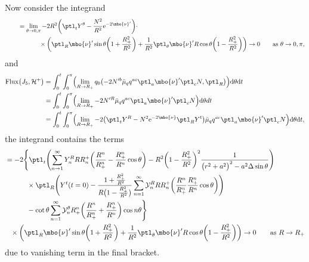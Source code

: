 Now consider the integrand
\begin{align*}
\qquad&{}= \lim_{\theta \to 0, \pi}-2 R^2 \biggl(\ptl_ t Y^\theta - \frac{N^2}{R^2} {\rm e}^{-2 \mbo{\nu}'} \biggr) \cdot \notag\\
&\hphantom{= \lim_{\theta \to 0, \pi}}{} \times \biggl( \ptl_R \mbo{\nu}' \sin \theta \biggl(1 + \frac{R^2_+}{R^2}\biggr) + \frac{1}{R^2} \ptl_ \theta \mbo{\nu}' R \cos \theta \biggl(1- \frac{R^2_+}{R^2}\biggr) \biggr)
 \to 0 \qquad \text{as} \ \theta \to 0, \pi,
\end{align*}
and
\begin{align*}
{\rm Flux} \bigl(J_5, \mathcal{H}^+\bigr) &{}= \int^t_0 \int^\pi _0 \Bigl(\lim_{R \to R_+} q_0 \bigl(-2N'^b \bar{\mu}_q q^{ac} \ptl_a \mbo{\nu}' \ptl_c N, \ptl_R\bigr) \Bigr) {\rm d}\theta {\rm d}t \notag \\
&{}= \int^t_0 \int^\pi _0 \Bigl(\lim_{R \to R_+} - 2 N'^R \bar{\mu}_q q^{ac} \ptl_a \mbo{\nu}' \ptl_c N \Bigr) {\rm d}\theta d t \notag \\
&{}= \int^t_0 \int^\pi_0 \Bigl( \lim_{R \to R_+} -2\bigl(\ptl_t Y^R - N^2 {\rm e}^{-2 \mbo{\nu}} \ptl_R Y^t\bigr) \bar{\mu}_q q^{ac} \ptl_a \mbo{\nu}' \ptl_c N \Bigr) {\rm d}\theta {\rm d}t,
\end{align*}
the integrand contains the terms
\begin{align*}
&
=- 2 \Biggl\{ \ptl_t \Biggl(\sum^\infty_{n \to 1} Y^R_n R R^+_n \biggl(\frac{R^n}{R^n_+}- \frac{R_+^n}{R^n} \cos \theta\biggr) - R^2 \biggl(1- \frac{R^2_+}{R^2}\biggr)^2 \frac{1}{ \bigl(r^2 +a^2\bigr)^2 - a^2 \Delta \sin \theta} \Biggr) \notag\\
&\hphantom{=- 2 \Biggl\{}{}
\times\ptl_R \Biggl(Y^t(t=0)- \frac{1+ \frac{R^2_+}{R^2}}{R \bigl(1- \frac{R_+^2}{R^2}\bigr)} \sum^\infty_{n = 1} \mathcal{Y}^R_n R R^+_n \biggl(\frac{R^n}{R^n_+} \frac{R_+^n}{R^n} \cos \theta \biggr) \Biggr) \notag \\
&\hphantom{=- 2 \Biggl\{}{}
- \cot \theta \sum^\infty_{n=1} \mathcal{Y}_n^\theta R^n_+\biggl(\frac{R^n}{R^n_+} + \frac{R^n_+}{R^n} \biggr) \cos n\theta \Biggr\} \notag\\
&\hphantom{=}{}
 \times \biggl(\ptl_R \mbo{\nu}' \sin \theta \biggl(1 + \frac{R^2_+}{R^2}\biggr) + \frac{1}{R^2} \ptl_\theta \mbo{\nu}' R \cos \theta \biggl(1- \frac{R^2_+}{R^2}\biggr) \biggr)
 \to 0 \qquad \text{as} \ R \to R_+
\end{align*}
due to vanishing term in the final bracket.

